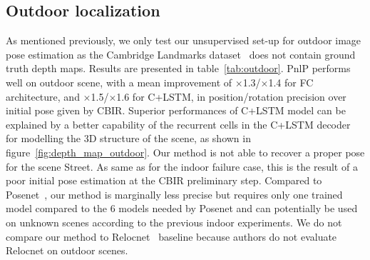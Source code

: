 \subsection{Outdoor localization}

As mentioned previously, we only test our unsupervised set-up for outdoor image pose estimation as the Cambridge Landmarks dataset~\citep{Kendall2015} does not contain ground truth depth maps. Results are presented in table~\ref{tab:outdoor}. PnlP performs well on outdoor scene, with a mean improvement of $\times$1.3/$\times$1.4 for FC architecture, and $\times$1.5/$\times$1.6 for C+LSTM, in position/rotation precision over initial pose given by CBIR. Superior performances of C+LSTM model can be explained by a better capability of the recurrent cells in the C+LSTM decoder for modelling the 3D structure of the scene, as shown in figure~\ref{fig:depth_map_outdoor}. Our method is not able to recover a proper pose for the scene Street. As same as for the indoor failure case, this is the result of a poor initial pose estimation at the CBIR preliminary step. Compared to Posenet~\citep{Kendall2017}, our method is marginally less precise but requires only one trained model compared to the 6 models needed by Posenet and can potentially be used on unknown scenes according to the previous indoor experiments. We do not compare our method to Relocnet~\citep{Purkait2018} baseline because authors do not evaluate Relocnet on outdoor scenes.



